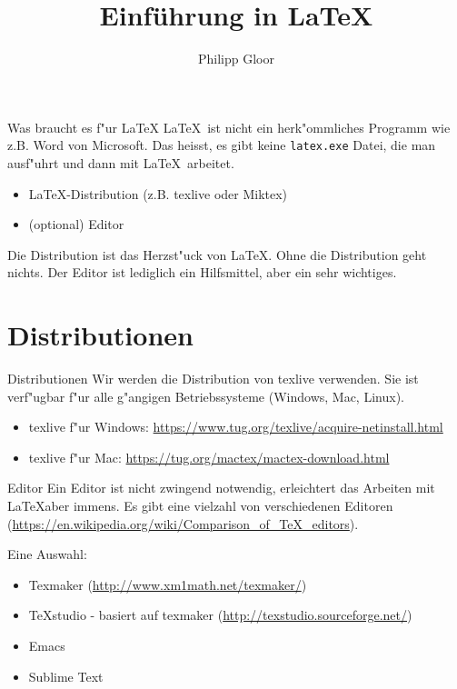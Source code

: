 \documentclass[10pt, xcolor={table}]{beamer}
\title[Einführung in \LaTeX] %
{Einführung in \LaTeX}
\author{Philipp Gloor}
\institute[] %
{\inst{1}philipp.gloor@gmail.com}
\date[Feburar 2016] %
\newlength{\wideitemsep}
\let\olditem\item
\renewcommand{\item}{\setlength{\itemsep}{\wideitemsep}\olditem}
\begin{document}
\begin{frame}
  \titlepage
\end{frame}
\begin{frame}{Was braucht es f"ur \LaTeX}
\LaTeX\  ist nicht ein herk"ommliches Programm wie z.B. Word von Microsoft. Das heisst, es gibt keine
\texttt{latex.exe} Datei, die man ausf"uhrt und dann mit \LaTeX\ arbeitet.
\begin{itemize}
  \item \LaTeX-Distribution (z.B. texlive oder Miktex)
  \item (optional) Editor
\end{itemize}

Die Distribution ist das Herzst"uck von \LaTeX. Ohne die Distribution geht nichts. Der Editor
ist lediglich ein Hilfsmittel, aber ein sehr wichtiges.
\end{frame}


\section{Distributionen}
\begin{frame}{Distributionen}
Wir werden die Distribution von texlive verwenden. Sie ist verf"ugbar f"ur alle g"angigen 
Betriebssysteme (Windows, Mac, Linux).

\begin{itemize}
  \item texlive f"ur Windows: \url{https://www.tug.org/texlive/acquire-netinstall.html}
  \item texlive f"ur Mac: \url{https://tug.org/mactex/mactex-download.html}
\end{itemize}
\end{frame}

\begin{frame}{Editor}
  Ein Editor ist nicht zwingend notwendig, erleichtert das Arbeiten mit \LaTeX aber immens. Es gibt eine vielzahl
  von verschiedenen Editoren (\url{https://en.wikipedia.org/wiki/Comparison_of_TeX_editors}).

  Eine Auswahl:
  \begin{itemize}
    \item Texmaker (\url{http://www.xm1math.net/texmaker/})
    \item TeXstudio - basiert auf texmaker (\url{http://texstudio.sourceforge.net/})
    \item Emacs
    \item Sublime Text
  \end{itemize}
\end{frame}
\end{document}
